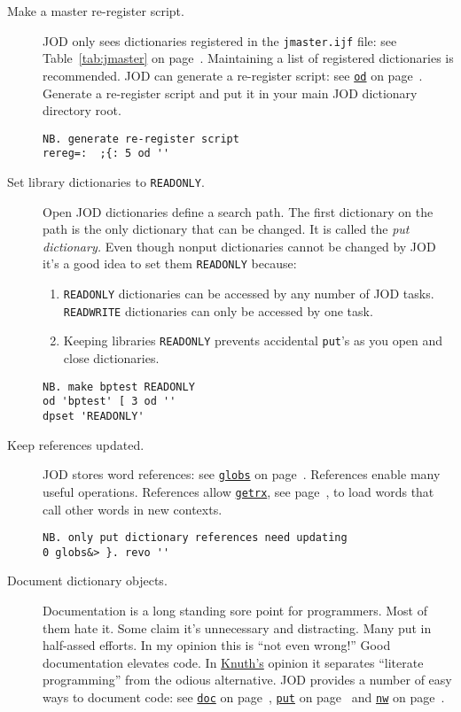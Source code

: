 \begin{description}
\item[Make a master re-register script.]   JOD only sees dictionaries registered in the \verb|jmaster.ijf| file:
see Table~\ref{tab:jmaster} on page~\pageref{tab:jmaster}.
Maintaining a list of registered dictionaries is recommended.  JOD can generate a re-register script: see \hyperlink{il:od}{\texttt{od}} on page~\pageref{ss:od}.  Generate a re-register script and put it in your main JOD dictionary directory root.

\begin{lstlisting}[frame=single,framerule=0pt]
NB. generate re-register script
rereg=:  ;{: 5 od ''
\end{lstlisting}
 

\item[Set library dictionaries to \texttt{READONLY}.]  Open JOD dictionaries define a search path.  The first dictionary on the path is the only dictionary that can be changed.  
It is called the \emph{put dictionary.}  Even though nonput 
dictionaries cannot be changed by JOD it's a good idea to set them \texttt{READONLY} because:
\begin{enumerate}
\item \texttt{READONLY} dictionaries can be accessed by any number of JOD tasks. \texttt{READWRITE} dictionaries can only be accessed by one task.  
\item Keeping libraries \texttt{READONLY} prevents accidental \texttt{put}'s as you open and close dictionaries.
\end{enumerate}

\begin{lstlisting}[frame=single,framerule=0pt]
NB. make bptest READONLY
od 'bptest' [ 3 od ''
dpset 'READONLY'
\end{lstlisting}
 
 
\item[Keep references updated.]  JOD stores word references: see \hyperlink{il:globs}{\texttt{globs}} on page~\pageref{ss:globs}.  References enable many useful operations. References allow \hyperlink{il:getrx}{\texttt{getrx}}, see page~\pageref{ss:getrx}, to load words that call other words in new contexts.

\begin{lstlisting}[frame=single,framerule=0pt]
NB. only put dictionary references need updating
0 globs&> }. revo ''
\end{lstlisting}
 
 
\item[Document dictionary objects.]  Documentation is a long standing sore point for programmers.  
Most of them hate it. Some claim it's unnecessary and distracting.  Many put in half-assed efforts. 
In my opinion this is ``not even wrong!''  Good documentation elevates code. In 
\href{http://www-cs-faculty.stanford.edu/~knuth/}{Knuth's} \cite{knuth:web} opinion it separates
``literate programming'' from the odious alternative.   JOD provides a number of easy ways to document code: see \hyperlink{il:doc}{\texttt{doc}} on page~\pageref{ss:doc}, 
\hyperlink{il:put}{\texttt{put}} on page~\pageref{ss:put} and \hyperlink{il:nw}{\texttt{nw}} on page~\pageref{ss:nw}.



\end{description}
